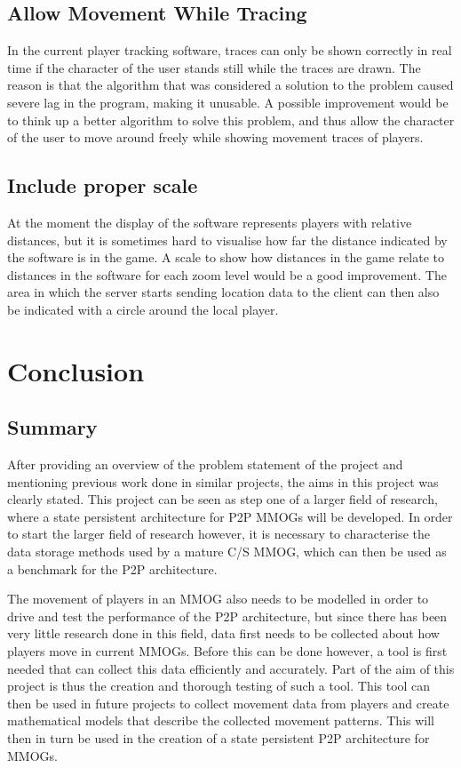 \subsection{Allow Movement While Tracing}

In the current player tracking software, traces can only be shown correctly in real time if the character of the user stands still while the traces are drawn. The reason is that the algorithm that was considered a solution to the problem caused severe lag in the program, making it unusable. A possible improvement would be to think up a better algorithm to solve this problem, and thus allow the character of the user to move around freely while showing movement traces of players.

\subsection{Include proper scale}

At the moment the display of the software represents players with relative distances, but it is sometimes hard to visualise how far the distance indicated by the software is in the game. A scale to show how distances in the game relate to distances in the software for each zoom level would be a good improvement. The area in which the server starts sending location data to the client can then also be indicated with a circle around the local player.

\section{Conclusion}

\subsection{Summary}
After providing an overview of the problem statement of the project and mentioning previous work done in similar projects, the aims in this project was clearly stated. This project can be seen as step one of a larger field of research, where a state persistent architecture for P2P MMOGs will be developed. In order to start the larger field of research however, it is necessary to characterise  the data storage methods used by a mature C/S MMOG, which can then be used as a benchmark for the P2P architecture. 

The movement of players in an MMOG also needs to be modelled in order to drive and test the performance of the P2P architecture, but since there has been very little research done in this field, data first needs to be collected about how players move in current MMOGs. Before this can be done however, a tool is first needed that can collect this data efficiently and accurately. Part of the aim of this project is thus the creation and thorough testing of such a tool. This tool can then be used in future projects to collect movement data from players and create mathematical models that describe the collected movement patterns. This will then in turn be used in the creation of a state persistent P2P architecture for MMOGs.

